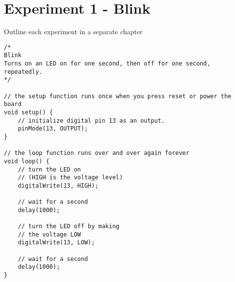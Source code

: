 \chapter*{Experiment 1 - Blink}

Outline each experiment in a separate chapter

\begin{lstlisting}
/*
Blink
Turns on an LED on for one second, then off for one second, repeatedly.
*/

// the setup function runs once when you press reset or power the board
void setup() {
	// initialize digital pin 13 as an output.
	pinMode(13, OUTPUT);
}

// the loop function runs over and over again forever
void loop() {
	// turn the LED on 
	// (HIGH is the voltage level)
	digitalWrite(13, HIGH);
	
	// wait for a second
	delay(1000);
	
	// turn the LED off by making 
	// the voltage LOW
	digitalWrite(13, LOW);    
	            
	// wait for a second              
	delay(1000);
}
\end{lstlisting}